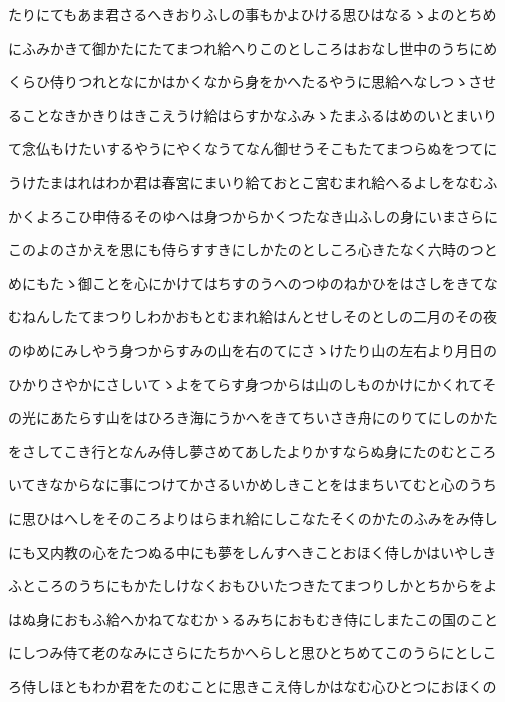 \documentclass[a4paper,11pt,landscape]{ltjtarticle}
\begin{document}
たりにてもあま君さるへきおりふしの事もかよひける思ひはなるゝよのとちめ
\par\medskip
にふみかきて御かたにたてまつれ給へりこのとしころはおなし世中のうちにめ
\par\medskip
くらひ侍りつれとなにかはかくなから身をかへたるやうに思給へなしつゝさせ
\par\medskip
ることなきかきりはきこえうけ給はらすかなふみゝたまふるはめのいとまいり
\par\medskip
て念仏もけたいするやうにやくなうてなん御せうそこもたてまつらぬをつてに
\par\medskip
うけたまはれはわか君は春宮にまいり給ておとこ宮むまれ給へるよしをなむふ
\par\medskip
かくよろこひ申侍るそのゆへは身つからかくつたなき山ふしの身にいまさらに
\par\medskip
このよのさかえを思にも侍らすすきにしかたのとしころ心きたなく六時のつと
\par\medskip
めにもたゝ御ことを心にかけてはちすのうへのつゆのねかひをはさしをきてな
\par\medskip
むねんしたてまつりしわかおもとむまれ給はんとせしそのとしの二月のその夜
\par\medskip
のゆめにみしやう身つからすみの山を右のてにさゝけたり山の左右より月日の
\par\medskip
ひかりさやかにさしいてゝよをてらす身つからは山のしものかけにかくれてそ
\par\medskip
の光にあたらす山をはひろき海にうかへをきてちいさき舟にのりてにしのかた
\par\medskip
をさしてこき行となんみ侍し夢さめてあしたよりかすならぬ身にたのむところ
\par\medskip
いてきなからなに事につけてかさるいかめしきことをはまちいてむと心のうち
\par\medskip
に思ひはへしをそのころよりはらまれ給にしこなたそくのかたのふみをみ侍し
\par\medskip
にも又内教の心をたつぬる中にも夢をしんすへきことおほく侍しかはいやしき
\par\medskip
ふところのうちにもかたしけなくおもひいたつきたてまつりしかとちからをよ
\par\medskip
はぬ身におもふ給へかねてなむかゝるみちにおもむき侍にしまたこの国のこと
\par\medskip
にしつみ侍て老のなみにさらにたちかへらしと思ひとちめてこのうらにとしこ
\par\medskip
ろ侍しほともわか君をたのむことに思きこえ侍しかはなむ心ひとつにおほくの
\par\medskip
\end{document}

